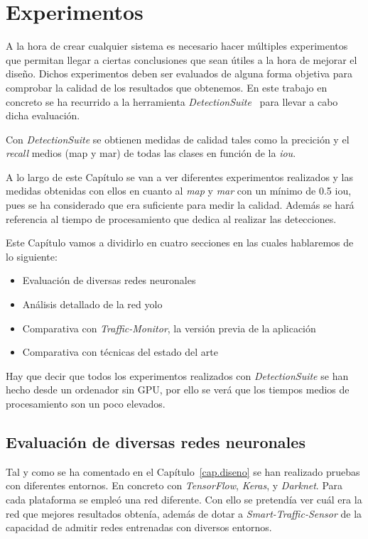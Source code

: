\chapter{Experimentos}\label{cap.experimentos}

A la hora de crear cualquier sistema es necesario hacer múltiples experimentos que permitan llegar a ciertas conclusiones que sean útiles a la hora de mejorar el diseño. Dichos experimentos deben ser evaluados de alguna forma objetiva para comprobar la calidad de los resultados que obtenemos. En este trabajo en concreto se ha recurrido a la herramienta \textit{DetectionSuite}~\cite{detectionsuite} para llevar a cabo dicha evaluación.

Con \textit{DetectionSuite} se obtienen medidas de calidad tales como la precición y el \textit{recall} medios (\acrshort{map} y \acrshort{mar}) de todas las clases en función de la \textit{\acrfull{iou}}. 

A lo largo de este Capítulo se van a ver diferentes experimentos realizados y las medidas obtenidas con ellos en cuanto al \textit{\acrfull{map}} y \textit{\acrfull{mar}} con un mínimo de 0.5 \acrshort{iou}, pues se ha considerado que era suficiente para medir la calidad. Además se hará referencia al tiempo de procesamiento que dedica al realizar las detecciones.


Este Capítulo vamos a dividirlo en cuatro secciones en las cuales hablaremos de lo siguiente:
\begin{itemize}
    \item Evaluación de diversas redes neuronales
    \item Análisis detallado de la red \acrshort{yolo}
    \item Comparativa con \textit{Traffic-Monitor}, la versión previa de la aplicación
    \item Comparativa con técnicas del estado del arte
\end{itemize}



Hay que decir que todos los experimentos realizados con \textit{DetectionSuite} se han hecho desde un ordenador sin GPU, por ello se verá que los tiempos medios de procesamiento son un poco elevados.

\section{Evaluación de diversas redes neuronales}
 
Tal y como se ha comentado en el Capítulo~\ref{cap.diseno} se han realizado pruebas con diferentes entornos. En concreto con \textit{TensorFlow}, \textit{Keras}, y \textit{Darknet}. Para cada plataforma se empleó una red diferente. Con ello se pretendía ver cuál era la red que mejores resultados obtenía, además de dotar a \textit{Smart-Traffic-Sensor} de la capacidad de admitir redes entrenadas con diversos entornos.

